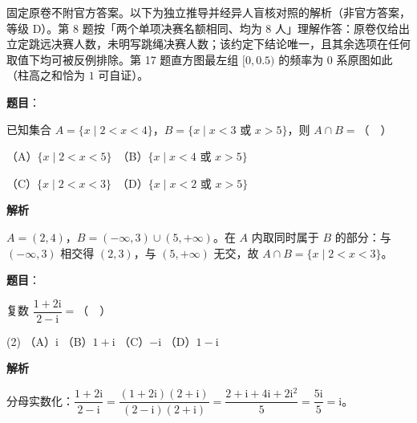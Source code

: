 

\begin{gktip}
固定原卷不附官方答案。以下为独立推导并经异人盲核对照的解析（非官方答案，等级 D）。第 8 题按「两个单项决赛名额相同、均为 8 人」理解作答：原卷仅给出立定跳远决赛人数，未明写跳绳决赛人数；该约定下结论唯一，且其余选项在任何取值下均可被反例排除。第 17 题直方图最左组 \([0,0.5)\) 的频率为 \(0\) 系原图如此（柱高之和恰为 \(1\) 可自证）。
\end{gktip}

\begin{answer}

\textbf{题目}：

已知集合 \(A=\{x\mid 2<x<4\}\)，\(B=\{x\mid x<3\) 或 \(x>5\}\)，则 \(A\cap B=\)（　）

（A）\(\{x\mid 2<x<5\}\)　（B）\(\{x\mid x<4\) 或 \(x>5\}\)

（C）\(\{x\mid 2<x<3\}\)　（D）\(\{x\mid x<2\) 或 \(x>5\}\)

\textbf{解析}

\(A=(2,4)\)，\(B=(-\infty,3)\cup(5,+\infty)\)。在 \(A\) 内取同时属于 \(B\) 的部分：与 \((-\infty,3)\) 相交得 \((2,3)\)，与 \((5,+\infty)\) 无交，故 \(A\cap B=\{x\mid 2<x<3\}\)。


\end{answer}
\begin{answer}

\textbf{题目}：

复数 \(\dfrac{1+2\mathrm{i}}{2-\mathrm{i}}=\)（　）

\begin{gkopts}(2)
\task （A）\(\mathrm{i}\)
\task （B）\(1+\mathrm{i}\)
\task （C）\(-\mathrm{i}\)
\task （D）\(1-\mathrm{i}\)
\end{gkopts}

\textbf{解析}

分母实数化：\(\dfrac{1+2\mathrm{i}}{2-\mathrm{i}}=\dfrac{(1+2\mathrm{i})(2+\mathrm{i})}{(2-\mathrm{i})(2+\mathrm{i})}=\dfrac{2+\mathrm{i}+4\mathrm{i}+2\mathrm{i}^2}{5}=\dfrac{5\mathrm{i}}{5}=\mathrm{i}\)。


\end{answer}
